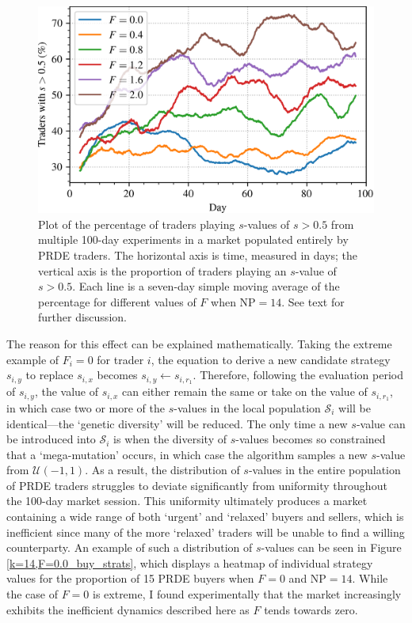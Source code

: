 \documentclass[a4paper,twoside]{article}
\begin{document}
\begin{figure}[htbp]
    \centerline{\includegraphics[width=\columnwidth]{k=14_strats.png}}
    \caption{
        Plot of the percentage of traders playing $s$-values of $s>0.5$ from multiple 100-day experiments in a market populated entirely by PRDE traders.
        The horizontal axis is time, measured in days; the vertical axis is the proportion of traders playing an $s$-value of $s>0.5$.
        Each line is a seven-day simple moving average of the percentage for different values of $F$ when $\mathrm{NP}=14$.
        See text for further discussion.
    }
    \label{k=14_strats}
\end{figure}

The reason for this effect can be explained mathematically.
Taking the extreme example of $F_i=0$ for trader $i$, the equation to derive a new candidate strategy $s_{i,y}$ to replace $s_{i,x}$ becomes $s_{i,y}\leftarrow s_{i,r_1}$.
Therefore, following the evaluation period of $s_{i,y}$, the value of $s_{i,x}$ can either remain the same or take on the value of $s_{i,r_1}$, in which case two or more of the $s$-values in the local population $\mathcal{S}_i$ will be identical---the `genetic diversity' will be reduced.
The only time a new $s$-value can be introduced into $\mathcal{S}_i$ is when the diversity of $s$-values becomes so constrained that a `mega-mutation' occurs, in which case the algorithm samples a new $s$-value from $\mathcal{U}(-1,1)$.
As a result, the distribution of $s$-values in the entire population of PRDE traders struggles to deviate significantly from uniformity throughout the 100-day market session.
This uniformity ultimately produces a market containing a wide range of both `urgent' and `relaxed' buyers and sellers, which is inefficient since many of the more `relaxed' traders will be unable to find a willing counterparty.
An example of such a distribution of $s$-values can be seen in Figure \ref{k=14,F=0.0_buy_strats}, which displays a heatmap of individual strategy values for the proportion of 15 PRDE buyers when $F=0$ and $\mathrm{NP}=14$.
While the case of $F=0$ is extreme, I found experimentally that the market increasingly exhibits the inefficient dynamics described here as $F$ tends towards zero.
\end{document}
